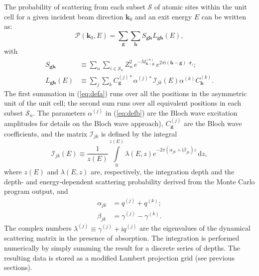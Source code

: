 \documentclass[DIV=calc, paper=letter, fontsize=11pt]{scrartcl}	 %
\begin{document}
The probability of scattering from each subset $\mathcal{S}$ of atomic sites within the 
unit cell for a given incident beam direction $\mathbf{k}_0$ and an exit energy $E$ can be written as:
\begin{equation}
\mathcal{P}(\mathbf{k}_0, E) = \sum_{\mathbf{g}}\sum_{\mathbf{h}} S_{\mathbf{g}\mathbf{h}}L_{\mathbf{g}\mathbf{h}}(E),
    \label{eq:prob}
\end{equation}
with
\begin{subequations}
\begin{align}
    S_{\mathbf{g}\mathbf{h}} &\equiv \sum_{n}\sum_{i\in\mathcal{S}_n} Z^2_n\,e^{-M^{(n)}_{\mathbf{h}-\mathbf{g}}}\,e^{2\pi\mathrm{i} 
    (\mathbf{h}-\mathbf{g})\cdot\mathbf{r}_{i}};\label{eq:defa}\\
    L_{\mathbf{g}\mathbf{h}}(E) &\equiv \sum_{j}\sum_{k} 
    C^{(j)\ast}_{\mathbf{g}}\alpha^{(j)\ast}\mathcal{I}_{jk}(E)\alpha^{(k)}
    C^{(k)}_{\mathbf{h}}.\label{eq:defb}
\end{align}
\end{subequations}
The first summation in (\ref{eq:defa}) runs over all the positions in the asymmetric unit of the unit cell; the second
sum runs over all equivalent positions in each subset $\mathcal{S}_n$.
The parameters $\alpha^{(j)}$ in (\ref{eq:defb}) are the Bloch wave excitation amplitudes for 
details on the Bloch wave approach), $C_{\mathbf{g}}^{(j)}$ are the 
Bloch wave coefficients, and the matrix $\mathcal{I}_{jk}$ is defined by the integral
\begin{equation}
	\mathcal{I}_{jk}(E)\equiv \frac{1}{z(E)}\int\limits_{0}^{z(E)} 
    \lambda(E,z) e^{-2\pi(\alpha_{jk}+\mathrm{i}\beta_{jk})z}\,\mathrm{d}z,
\end{equation}
where $z(E)$ and $\lambda(E,z)$ are, respectively, the integration depth and the depth- and 
energy-dependent scattering probability derived from the Monte Carlo program output,
and
\begin{subequations}
\begin{align}
    \alpha_{jk} &= q^{(j)}+q^{(k)};\\
    \beta_{jk} &= \gamma^{(j)}-\gamma^{(k)}.
\end{align}
\end{subequations}
The complex numbers $\lambda^{(j)}\equiv\gamma^{(j)}+\mathrm{i}q^{(j)}$ are the eigenvalues of the dynamical scattering matrix in the 
presence of absorption.  The integration is performed numerically by simply summing the result for a discrete series of depths.
The resulting data is stored as a modified Lambert projection grid (see previous sections).  
\end{document}
